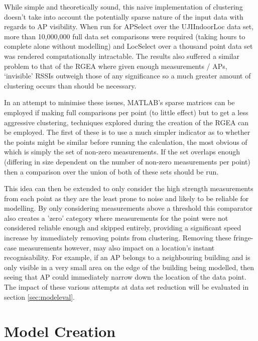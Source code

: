 \documentclass{UoYCSproject}
\begin{document}
	        While simple and theoretically sound, this naive implementation of clustering doesn't take into account the potentially sparse nature of the input data with regards to AP visibility. When run for APSelect over the UJIIndoorLoc data set, more than 10,000,000 full data set comparisons were required (taking hours to complete alone without modelling) and LocSelect over a thousand point data set was rendered computationally intractable. The results also suffered a similar problem to that of the RGEA where given enough measurements / APs, `invisible' RSSIs outweigh those of any significance so a much greater amount of clustering occurs than should be necessary.
	        
	        In an attempt to minimise these issues, MATLAB's sparse matrices can be employed if making full comparisons per point (to little effect) but to get a less aggressive clustering, techniques explored during the creation of the RGEA can be employed. The first of these is to use a much simpler indicator as to whether the points might be similar before running the calculation, the most obvious of which is simply the set of non-zero measurements. If the set overlaps enough (differing in size dependent on the number of non-zero measurements per point) then a comparison over the union of both of these sets should be run.
	        
	        This idea can then be extended to only consider the high strength measurements from each point as they are the least prone to noise and likely to be reliable for modelling. By only considering measurements above a threshold this comparator also creates a 'zero' category where measurements for the point were not considered reliable enough and skipped entirely, providing a significant speed increase by immediately removing points from clustering. Removing these fringe-case measurements however, may also impact on a location's instant recognisability. For example, if an AP belongs to a neighbouring building and is only visible in a very small area on the edge of the building being modelled, then seeing that AP could immediately narrow down the location of the data point. The impact of these various attempts at data set reduction will be evaluated in section \ref{sec:modeleval}.
		
		\section{Model Creation}
        \label{sec:modelcreation}
        
\end{document}
